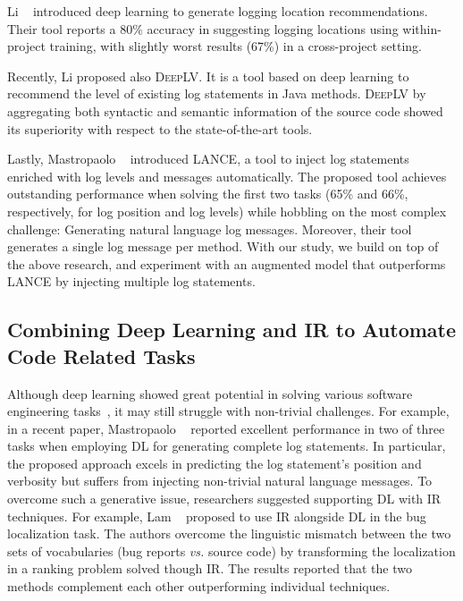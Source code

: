 Li \etal~\cite{li2020shall} introduced deep learning to generate logging location recommendations. Their tool reports a 80\% accuracy in suggesting logging locations using within-project training, with slightly worst results (67\%) in a cross-project setting.

Recently, Li \etal \cite{li2021deeplv} proposed also \textsc{DeepLV}. It is a tool based on deep learning to recommend the level of existing log statements in Java methods. \textsc{DeepLV} by aggregating both syntactic and semantic information of the source code showed its superiority with respect to the state-of-the-art tools.

Lastly, Mastropaolo \etal~\cite{mastropaolo2022using} introduced \textsc{LANCE}, a tool to inject log statements enriched with log levels and messages automatically. The proposed tool achieves outstanding performance when solving the first two tasks (65\% and 66\%, respectively, for log position and log levels) while hobbling on the most complex challenge: Generating natural language log messages. Moreover, their tool generates a single log message per method. With our study, we build on top of the above research, and experiment with an augmented model that outperforms \textsc{LANCE} by injecting multiple log statements. 

\subsection{Combining Deep Learning and IR to Automate Code Related Tasks}

Although deep learning showed great potential in solving various software engineering tasks~\cite{watsonSytematicLiterature2020}, it may still struggle with non-trivial challenges. For example, in a recent paper, Mastropaolo \etal~\cite{mastropaolo2022using} reported excellent performance in two of three tasks when employing DL for generating complete log statements. In particular, the proposed approach excels in predicting the log statement's position and verbosity but suffers from injecting non-trivial natural language messages. To overcome such a generative issue, researchers suggested supporting DL with IR techniques. For example, Lam \etal~\cite{LamBugLocalization2017} proposed to use IR alongside DL in the bug localization task. The authors overcome the linguistic mismatch between the two sets of vocabularies (\ie bug reports \emph{vs.} source code) by transforming the localization in a ranking problem solved though IR. The results reported that the two methods complement each other outperforming individual techniques. 

